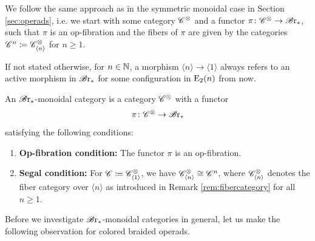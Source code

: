 We follow the same approach as in the symmetric monoidal case in Section
\ref{sec:operads}, i.e. we start with some category $\mathscr{C}^{\otimes}$ and a functor
$\pi \colon \mathscr{C}^{\otimes} \to \mathscr{B} \text{r}_{\ast}$, such that $\pi$ is an op-fibration and the
fibers of $\pi$ are given by the categories $\mathscr{C}^n \coloneqq \mathscr{C}^{\otimes}_{\langle n
\rangle}$ for $n \geq 1$.

If not stated otherwise, for $n \in \mathbb{N}$, a morphism $\langle n \rangle \to
\langle 1 \rangle$ always refers to an active morphism in $\mathscr{B} \text{r}_{\ast}$ for some
configuration in $\operatorname{E}_2(n)$ from now. 

\begin{defin}
    An $\mathscr{B} \text{r}_{\ast}$-monoidal category is a category $\mathscr{C}^{\otimes}$ with a functor
    \[
        \pi \colon \mathscr{C}^{\otimes} \to \mathscr{B} \text{r}_{\ast}
    \]
    satisfying the following conditions:
        \begin{enumerate}[(M1)]
            \item \textbf{Op-fibration condition:} The functor $\pi$ is an
            op-fibration.
            \item \textbf{Segal condition:} For $\mathscr{C} \coloneqq \mathscr{C}^{\otimes}_{\langle
            1 \rangle}$, we have $\mathscr{C}^{\otimes}_{\langle n \rangle} \cong \mathscr{C}^n$,
            where $\mathscr{C}^{\otimes}_{\langle n \rangle}$ denotes the fiber category over
            $\langle n \rangle$ as introduced in Remark \ref{rem:fibercategory}
            for all $n \geq 1$.
        \end{enumerate}

\end{defin}

Before we investigate $\mathscr{B} \text{r}_{\ast}$-monoidal categories in general, let us make the following observation
for colored braided operads.

